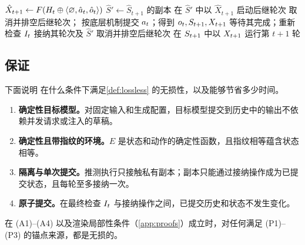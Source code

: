 \begin{algorithm}[t]
\caption{\method 在第 $t$ 轮和第 $t{+}1$ 轮上的一个窗口。}
\label{alg:window}
\small
\begin{algorithmic}[1]
    \State $\hat X_{t+1}\gets F(H_t\oplus\langle\varnothing,\hat a_t,\hat o_t\rangle)$
    \State $\hat S'\gets\hat S_{t+1}$ 的副本 
    \State 在 $\hat S'$ 中以 $\hat X_{t+1}$ 启动后继轮次
  \EndIf
\EndProcedure
{}
    \State 取消并排空后继轮次；\Return
  \EndIf
  \State 按底层机制提交 $a_{t}$；得到 $o_{t},S_{t+1},X_{t+1}$
    \State 等待其完成；重新检查 $I_t$
    \State 接纳其轮次及 $\hat S'$
  \Else
    \State 取消并排空后继轮次
    \State 在 $S_{t+1}$ 中以 $X_{t+1}$ 运行第 $t{+}1$ 轮
  \EndIf
\EndProcedure
\end{algorithmic}
\end{algorithm}

\subsection{保证}
\label{sec:method:guarantees}

下面说明 \method 在什么条件下满足\cref{def:lossless} 的无损性，以及能够节省多少时间。

\begin{assumption}[执行模型]
\label{ass:exec}
\leavevmode
\begin{enumerate}[label=(A\arabic*),leftmargin=*,nosep]
\item \textbf{确定性目标模型。}对固定输入和生成配置，目标模型提交到历史中的输出不依赖并发请求或注入的草稿。
\item \textbf{确定性且带指纹的环境。}$E$ 是状态和动作的确定性函数，且指纹相等蕴含状态相等。
\item \textbf{隔离与单次提交。}推测执行只接触私有副本；副本只能通过接纳操作成为已提交状态，且每轮至多接纳一次。
\item \textbf{原子提交。}在最终检查 $I_t$ 与接纳操作之间，已提交历史和状态不发生变化。
\end{enumerate}
\end{assumption}

\begin{proposition}[无损性]
\label{prop:lossless}
在 (A1)--(A4) 以及渲染局部性条件（\cref{app:proofs}）成立时，对任何满足 (P1)--(P3) 的锚点来源，\method 都是无损的。
\end{proposition}

